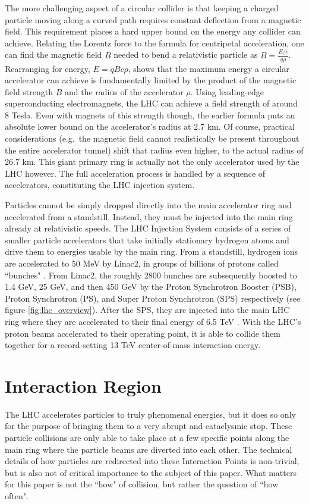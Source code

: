     The more challenging aspect of a circular collider is that keeping a charged particle moving along a curved path requires constant deflection from a magnetic field.
    This requirement places a hard upper bound on the energy any collider can achieve.
    Relating the Lorentz force to the formula for centripetal acceleration, one can find the magnetic field $B$ needed to bend a relativistic particle as $B=\frac{E/c}{q \rho}$.
    Rearranging for energy, $E = q B c \rho$, shows that the maximum energy a circular accelerator can achieve is fundamentally limited by the product of the magnetic field strength $B$ and the radius of the accelerator $\rho$.
    Using leading-edge superconducting electromagnets, the LHC can achieve a field strength of around 8 Tesla.
    Even with magnets of this strength though, the earlier formula puts an absolute lower bound on the accelerator's radius at 2.7 km.
    Of course, practical considerations (e.g.\ the magnetic field cannot realistically be present throughout the entire accelerator tunnel) shift that radius even higher, to the actual radius of 26.7 km.
    This giant primary ring is actually not the only accelerator used by the LHC however.
    The full acceleration process is handled by a sequence of accelerators, constituting the LHC injection system.

    Particles cannot be simply dropped directly into the main accelerator ring and accelerated from a standstill.
    Instead, they must be injected into the main ring already at relativistic speeds.
    The LHC Injection System consists of a series of smaller particle accelerators that take initially stationary hydrogen atoms and drive them to energies usable by the main ring.
    From a standstill, hydrogen ions are accelerated to 50 MeV by Linac2, in groups of billions of protons called ``bunches" \cite{lhc_run2}.
    From Linac2, the roughly 2800 bunches are subsequently boosted to 1.4 GeV, 25 GeV, and then 450 GeV by the Proton Synchrotron Booster (PSB), Proton Synchrotron (PS), and Super Proton Synchrotron (SPS) respectively (see figure \ref{fig:lhc_overview}).
    After the SPS, they are injected into the main LHC ring where they are accelerated to their final energy of 6.5 TeV \cite{lhc_machine}.
    With the LHC's proton beams accelerated to their operating point, it is able to collide them together for a record-setting 13 TeV center-of-mass interaction energy.


\section{Interaction Region}
    The LHC accelerates particles to truly phenomenal energies, but it does so only for the purpose of bringing them to a very abrupt and cataclysmic stop.
    These particle collisions are only able to take place at a few specific points along the main ring where the particle beams are diverted into each other.
    The technical details of how particles are redirected into these Interaction Points is non-trivial, but is also not of critical importance to the subject of this paper.
    What matters for this paper is not the ``how" of collision, but rather the question of ``how often".

